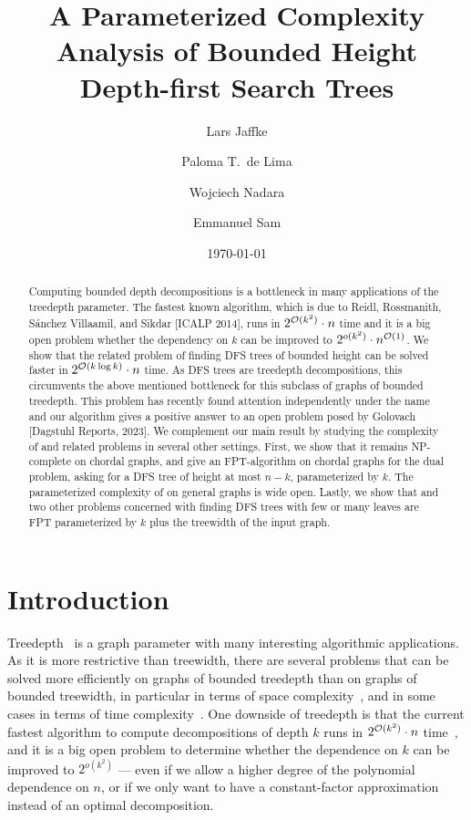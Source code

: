 \documentclass[a4paper,11pt]{article}
\title{A Parameterized Complexity Analysis of Bounded Height Depth-first Search Trees}
\author[1]{Lars Jaffke}
\author[2]{Paloma T.\ de Lima}
\author[3]{Wojciech Nadara}
\author[4]{Emmanuel Sam}
\affil[1]{NHH Norwegian School of Economics, Bergen, Norway}
\affil[2]{IT University of Copenhagen, Copenhagen, Denmark}
\affil[3]{University of Warsaw, Warsaw, Poland and Technical University of Denmark, Lyngby, Denmark}
\affil[4]{University of Bergen, Bergen, Norway}
\date{\today}
\begin{document}
\maketitle

\begin{abstract}
    Computing bounded depth decompositions is a bottleneck in many applications of the treedepth parameter. 
    The fastest known algorithm,
    which is
    due to Reidl, Rossmanith, S{\'{a}}nchez Villaamil, and Sikdar [ICALP 2014], 
    runs in $2^{{\mathcal{O}}(k^2)}\cdot n$ time
    and it is a big open problem whether the dependency on $k$ can be improved to $2^{o(k^2)}\cdot n^{{\mathcal{O}}(1)}$.
    We show that the related problem of finding DFS trees of bounded height can be solved faster in $2^{{\mathcal{O}}(k \log k)}\cdot n$ time.
    As DFS trees are treedepth decompositions,
    this circumvents the above mentioned bottleneck for this subclass of graphs of bounded treedepth.
    This problem has recently found attention independently 
    under the name 
    \MinHProb
    and our algorithm gives a positive answer to an open problem posed by Golovach [Dagstuhl Reports, 2023].
    We complement our main result by studying the complexity of \MinHProb and related problems in several other settings.
    First, we show that it remains NP-complete on chordal graphs, 
    and give an FPT-algorithm on chordal graphs for the dual problem, asking for a DFS tree of height at most $n-k$, parameterized by $k$.
    The parameterized complexity of \DualMinHProb on general graphs is wide open.
    Lastly, we show that \DualMinHProb and two other problems concerned with finding DFS trees with few or many leaves are FPT parameterized by $k$ plus the treewidth of the input graph.
\end{abstract}


\section{Introduction}
%
Treedepth~\cite{Nesetril2012} is a graph parameter with many interesting algorithmic applications.
As it is more restrictive than treewidth, 
there are several problems that can be solved more efficiently on graphs of bounded treedepth than on graphs of bounded treewidth,
in particular in terms of space complexity~\cite{FurerY17,HegerfeldK20,NederlofPSW23,PilipczukS21,PilipczukW18},
and in some cases in terms of time complexity~\cite{DvorakK18,KellerhalsK22}.
%
One downside of treedepth is that the current fastest algorithm to compute decompositions of depth $k$ runs in $2^{{\mathcal{O}}(k^2)}\cdot n$ time~\cite{Reidl14},
and it is a big open problem to determine whether the dependence on $k$ can be improved to $2^{o(k^2)}$ --- even if we allow a higher degree of the polynomial dependence on $n$,
or if we only want to have a constant-factor approximation instead of an optimal decomposition.
\end{document}
